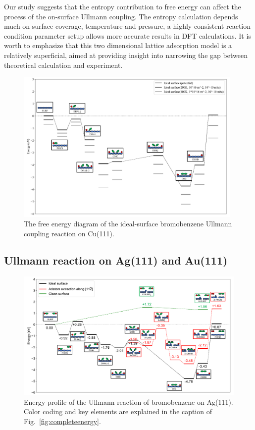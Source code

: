 \documentclass[aps,prb,amsmath,amssymb,11pt]{revtex4-1}
\begin{document}
{Our study suggests that the entropy contribution to free energy can affect the process of the on-surface Ullmann coupling. The entropy calculation depends much on surface coverage, temperature and pressure, a highly consistent reaction condition parameter setup allows more accurate results in DFT calculations. It is worth to emphasize that this two dimensional lattice adsorption model is a relatively superficial, aimed at providing insight into narrowing the gap between theoretical calculation and experiment. 
}

\begin{figure}[bt]
\centering
\includegraphics[width=0.98\textwidth]{Fig/entropy-correction.pdf}
\caption{The free energy diagram of the ideal-surface bromobenzene Ullmann coupling reaction on Cu(111).}
\label{fig:entropy}
\end{figure}

\fi

\ifdefined\INTERNAL
\subsection{Ullmann reaction on Ag(111) and Au(111)}
\fi

\begin{figure}[bt]
\centering
\includegraphics[width=1.\textwidth]{Fig/Ag_mainfile.pdf}
\caption{Energy profile of the Ullmann reaction of bromobenzene on Ag(111). Color coding and key elements are explained in the caption of Fig.~\ref{fig:completeenergy}.}
\label{fig:Ag_all}
\end{figure}
\end{document}
